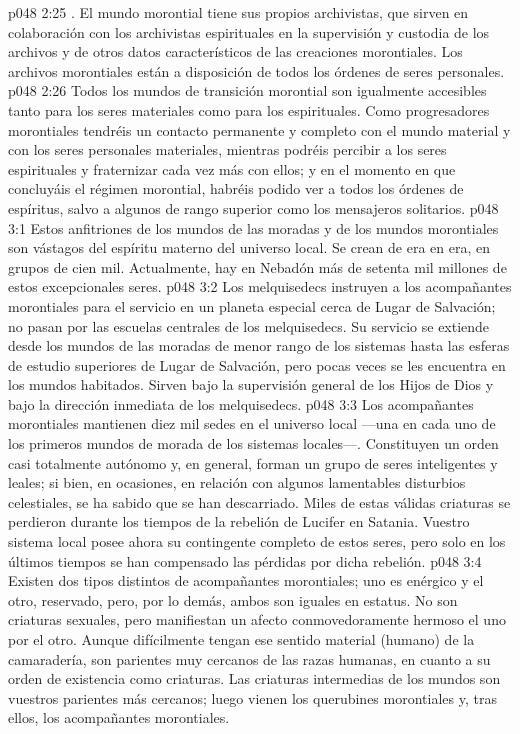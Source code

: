 \vs p048 2:25 . El mundo morontial tiene sus propios archivistas, que sirven en colaboración con los archivistas espirituales en la supervisión y custodia de los archivos y de otros datos característicos de las creaciones morontiales. Los archivos morontiales están a disposición de todos los órdenes de seres personales.
\vs p048 2:26 Todos los mundos de transición morontial son igualmente accesibles tanto para los seres materiales como para los espirituales. Como progresadores morontiales tendréis un contacto permanente y completo con el mundo material y con los seres personales materiales, mientras podréis percibir a los seres espirituales y fraternizar cada vez más con ellos; y en el momento en que concluyáis el régimen morontial, habréis podido ver a todos los órdenes de espíritus, salvo a algunos de rango superior como los mensajeros solitarios.
\vs p048 3:1 Estos anfitriones de los mundos de las moradas y de los mundos morontiales son vástagos del espíritu materno del universo local. Se crean de era en era, en grupos de cien mil. Actualmente, hay en Nebadón más de setenta mil millones de estos excepcionales seres.
\vs p048 3:2 Los melquisedecs instruyen a los acompañantes morontiales para el servicio en un planeta especial cerca de Lugar de Salvación; no pasan por las escuelas centrales de los melquisedecs. Su servicio se extiende desde los mundos de las moradas de menor rango de los sistemas hasta las esferas de estudio superiores de Lugar de Salvación, pero pocas veces se les encuentra en los mundos habitados. Sirven bajo la supervisión general de los Hijos de Dios y bajo la dirección inmediata de los melquisedecs.
\vs p048 3:3 Los acompañantes morontiales mantienen diez mil sedes en el universo local ---una en cada uno de los primeros mundos de morada de los sistemas locales---. Constituyen un orden casi totalmente autónomo y, en general, forman un grupo de seres inteligentes y leales; si bien, en ocasiones, en relación con algunos lamentables disturbios celestiales, se ha sabido que se han descarriado. Miles de estas válidas criaturas se perdieron durante los tiempos de la rebelión de Lucifer en Satania. Vuestro sistema local posee ahora su contingente completo de estos seres, pero solo en los últimos tiempos se han compensado las pérdidas por dicha rebelión.
\vs p048 3:4 \pc Existen dos tipos distintos de acompañantes morontiales; uno es enérgico y el otro, reservado, pero, por lo demás, ambos son iguales en estatus. No son criaturas sexuales, pero manifiestan un afecto conmovedoramente hermoso el uno por el otro. Aunque difícilmente tengan ese sentido material (humano) de la camaradería, son parientes muy cercanos de las razas humanas, en cuanto a su orden de existencia como criaturas. Las criaturas intermedias de los mundos son vuestros parientes más cercanos; luego vienen los querubines morontiales y, tras ellos, los acompañantes morontiales.
